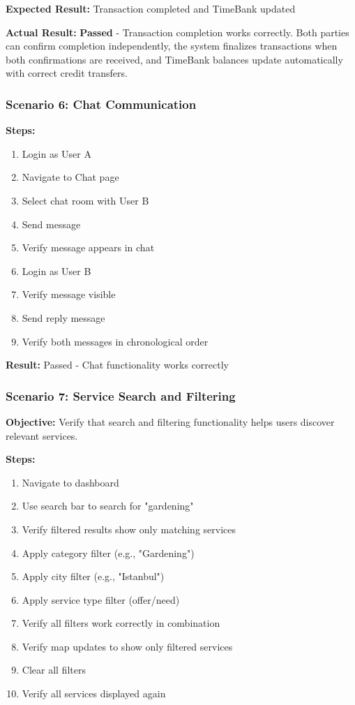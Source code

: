 \documentclass[12pt,a4paper]{report}
\begin{document}
\textbf{Expected Result:} Transaction completed and TimeBank updated

\textbf{Actual Result:} \textbf{Passed} - Transaction completion works correctly. Both parties can confirm completion independently, the system finalizes transactions when both confirmations are received, and TimeBank balances update automatically with correct credit transfers.

\subsubsection{Scenario 6: Chat Communication}

\textbf{Steps:}
\begin{enumerate}
    \item Login as User A
    \item Navigate to Chat page
    \item Select chat room with User B
    \item Send message
    \item Verify message appears in chat
    \item Login as User B
    \item Verify message visible
    \item Send reply message
    \item Verify both messages in chronological order
\end{enumerate}

\textbf{Result:} Passed - Chat functionality works correctly

\subsubsection{Scenario 7: Service Search and Filtering}

\textbf{Objective:} Verify that search and filtering functionality helps users discover relevant services.

\textbf{Steps:}
\begin{enumerate}
    \item Navigate to dashboard
    \item Use search bar to search for "gardening"
    \item Verify filtered results show only matching services
    \item Apply category filter (e.g., "Gardening")
    \item Apply city filter (e.g., "Istanbul")
    \item Apply service type filter (offer/need)
    \item Verify all filters work correctly in combination
    \item Verify map updates to show only filtered services
    \item Clear all filters
    \item Verify all services displayed again
\end{enumerate}
\end{document}
